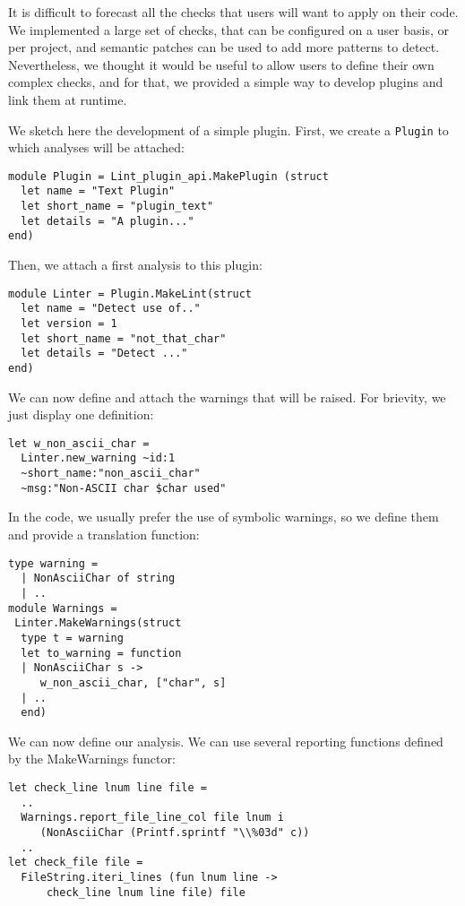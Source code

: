 It is difficult to forecast all the checks that users will want to
apply on their code. We implemented a large set of checks, that can be
configured on a user basis, or per project, and semantic patches can
be used to add more patterns to detect. Nevertheless, we thought it
would be useful to allow users to define their own complex checks, and
for that, we provided a simple way to develop plugins and link them at
runtime.

We sketch here the development of a simple plugin. First, we create a
\verb-Plugin- to which analyses will be attached:
\noindent\begin{lstlisting}[language=caml]
module Plugin = Lint_plugin_api.MakePlugin (struct
  let name = "Text Plugin"
  let short_name = "plugin_text"
  let details = "A plugin..."
end)
\end{lstlisting}

Then, we attach a first analysis to this plugin:
\noindent\begin{lstlisting}[language=caml]
module Linter = Plugin.MakeLint(struct
  let name = "Detect use of.."
  let version = 1
  let short_name = "not_that_char"
  let details = "Detect ..."
end)
\end{lstlisting}

We can now define and attach the warnings that will be raised.
For brievity, we just display one definition:
\noindent\begin{lstlisting}[language=caml]
let w_non_ascii_char =
  Linter.new_warning ~id:1
  ~short_name:"non_ascii_char"
  ~msg:"Non-ASCII char $char used"
\end{lstlisting}

In the code, we usually prefer the use of symbolic warnings, so we
define them and provide a translation function:
\noindent\begin{lstlisting}[language=caml]
type warning =
  | NonAsciiChar of string
  | ..
module Warnings =
 Linter.MakeWarnings(struct
  type t = warning
  let to_warning = function
  | NonAsciiChar s ->
     w_non_ascii_char, ["char", s]
  | ..
  end)
\end{lstlisting}

We can now define our analysis. We can use several
reporting functions defined by the {\sf MakeWarnings}
functor:
\noindent\begin{lstlisting}[language=caml]
let check_line lnum line file =
  ..
  Warnings.report_file_line_col file lnum i
     (NonAsciiChar (Printf.sprintf "\\%03d" c))
  ..
let check_file file =
  FileString.iteri_lines (fun lnum line ->
      check_line lnum line file) file
\end{lstlisting}

